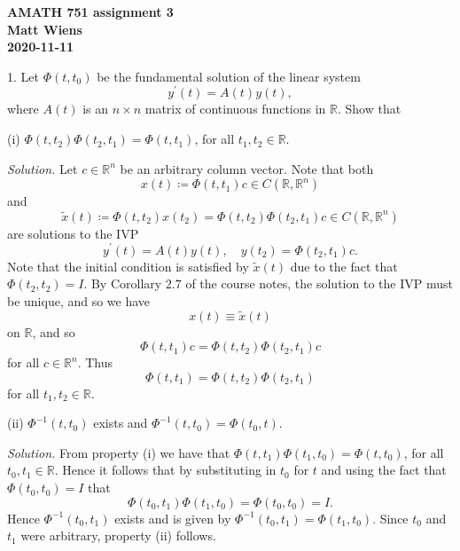 \documentclass{article}
\newcommand{\R}{\mathbb{R}}
\begin{document}
\textbf{AMATH 751 assignment 3} \\
\textbf{Matt Wiens} \\
\textbf{2020-11-11}

1. Let $\Phi(t, t_0)$ be the fundamental solution of the linear system
%
\begin{equation*}
    y^\prime(t) = A(t) y(t),
\end{equation*}
%
where $A(t)$ is an $n \times n$ matrix of continuous functions in $\R$. Show that

(i) $\Phi(t, t_2) \Phi(t_2, t_1) = \Phi(t, t_1)$, for all $t_1, t_2 \in \R$.

\textit{Solution.}
Let $c \in \R^n$ be an arbitrary column vector.
Note that both
%
\begin{equation*}
    x(t) \coloneqq \Phi(t, t_1) c \in C(\R, \R^n)
\end{equation*}
%
and
%
\begin{equation*}
    \tilde{x}(t) \coloneqq \Phi(t, t_2) x(t_2) = \Phi(t, t_2) \Phi(t_2, t_1) c \in C(\R, \R^n)
\end{equation*}
%
are solutions to the IVP
%
\begin{equation*}
    y^\prime(t) = A(t)y(t), \quad y(t_2) = \Phi(t_2, t_1) c
    .
\end{equation*}
%
Note that the initial condition is satisfied by $\tilde{x}(t)$
due to the fact that $\Phi(t_2, t_2) = I$.
By Corollary $2.7$ of the course notes, the solution to the
IVP must be unique, and so we have
%
\begin{equation*}
    x(t) \equiv \tilde{x}(t)
\end{equation*}
%
on $\R$, and so
%
\begin{equation*}
    \Phi(t, t_1) c = \Phi(t, t_2) \Phi(t_2, t_1) c
\end{equation*}
%
for all $c \in \R^n$. Thus
%
\begin{equation*}
    \Phi(t, t_1) = \Phi(t, t_2) \Phi(t_2, t_1)
\end{equation*}
%
for all $t_1, t_2 \in \R$.

\vspace{5mm}

(ii) $\Phi^{-1}(t, t_0)$ exists and $\Phi^{-1}(t, t_0) = \Phi(t_0, t)$.

\textit{Solution.}
From property (i) we have that
$\Phi(t, t_1) \Phi(t_1, t_0) = \Phi(t, t_0)$, for all $t_0, t_1 \in \R$.
Hence it follows that by substituting in $t_0$ for $t$ and using the fact that
$\Phi(t_0, t_0) = I$ that
%
\begin{equation*}
    \Phi(t_0, t_1) \Phi(t_1, t_0) = \Phi(t_0, t_0) = I
    .
\end{equation*}
%
Hence $\Phi^{-1}(t_0, t_1)$ exists and is given by $\Phi^{-1}(t_0, t_1) = \Phi(t_1, t_0)$.
Since $t_0$ and $t_1$ were arbitrary, property (ii) follows.
\end{document}

